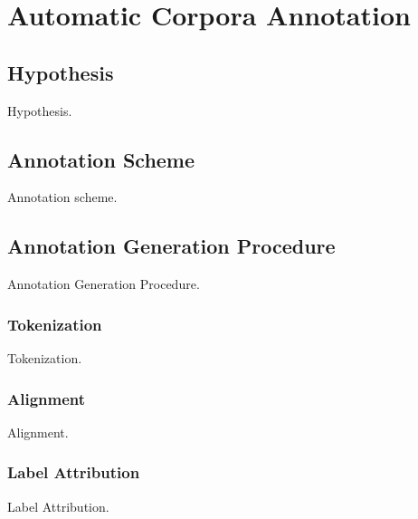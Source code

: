 
\chapter{Automatic Corpora Annotation}

\section{Hypothesis}

Hypothesis.

\section{Annotation Scheme}

Annotation scheme.

\section{Annotation Generation Procedure}

Annotation Generation Procedure.

\subsection{Tokenization}

Tokenization.

\subsection{Alignment}

Alignment.

\subsection{Label Attribution}

Label Attribution.